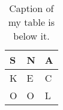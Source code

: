 \begin{table}[htbp]
\centering
\begin{tabular}{|l|l|l|}
\hline
\rowcolor[HTML]{675643} 
S & N & A \\ \hline
K & E & C          \\ \hline
O & O & L          \\ \hline

\end{tabular}
\label{tab:snake}
\caption{Caption of my table is below it.}
\end{table}